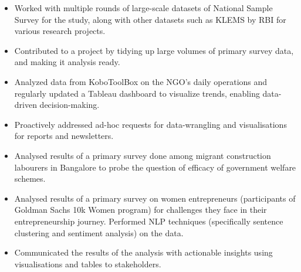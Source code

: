 \documentclass[9pt,a4paper]{altacv}
\begin{document}
\begin{paracol}{2}
\begin{itemize}
\end{itemize}
\begin{itemize}
    \item Worked with multiple rounds of large-scale datasets of National Sample Survey for the study, along with other datasets such as KLEMS by RBI for various research projects.
    \item Contributed to a project by tidying up large volumes of primary survey data, and making it analysis ready.
\end{itemize}
\begin{itemize}
    \item Analyzed data from KoboToolBox on the NGO's daily operations and regularly updated a Tableau dashboard to visualize trends, enabling data-driven decision-making.
    \item Proactively addressed ad-hoc requests for data-wrangling and visualisations for reports and newsletters.
\end{itemize}
\divider
{}
\begin{itemize}
    \item Analysed results of a primary survey done among migrant construction labourers in Bangalore to probe the question of efficacy of government welfare schemes.
\end{itemize}
\divider
{}
\begin{itemize}
    \item Analysed results of a primary survey on women entrepreneurs (participants of Goldman Sachs 10k Women program) for challenges they face in their entrepreneurship journey. Performed NLP techniques (specifically sentence clustering and sentiment analysis) on the data. 
    \item Communicated the results of the analysis with actionable insights using visualisations and tables to stakeholders.
\end{itemize}
\divider
{}
\begin{itemize}

\end{itemize}
\end{paracol}
\end{document}
